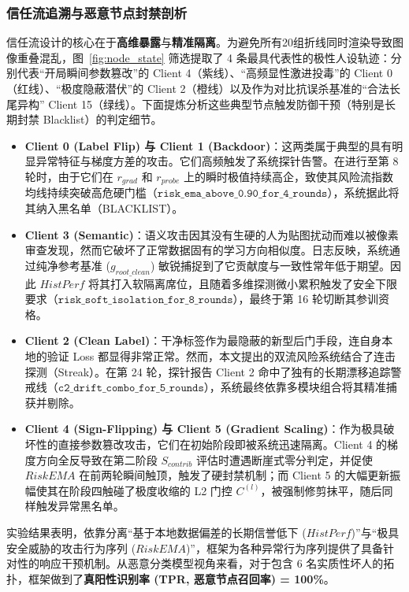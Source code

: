 \documentclass[11pt, a4paper, UTF8, fontset=fandol]{ctexart}
\begin{document}
\subsubsection{信任流追溯与恶意节点封禁剖析}
信任流设计的核心在于\textbf{高维暴露}与\textbf{精准隔离}。为避免所有20组折线同时渲染导致图像重叠混乱，图~\ref{fig:node_state} 筛选提取了 4 条最具代表性的极性人设轨迹：分别代表“开局瞬间参数篡改”的 Client 4（紫线）、“高频显性激进投毒”的 Client 0（红线）、“极度隐蔽潜伏”的 Client 2（橙线）以及作为对比抗误杀基准的“合法长尾异构” Client 15（绿线）。下面提炼分析这些典型节点触发防御干预（特别是长期封禁 Blacklist）的判定细节。
\begin{itemize}
    \item \textbf{Client 0 (Label Flip) 与 Client 1 (Backdoor)}：这两类属于典型的具有明显异常特征与梯度方差的攻击。它们高频触发了系统探针告警。在进行至第 8 轮时，由于它们在 $r_{grad}$ 和 $r_{probe}$ 上的瞬时极值持续高企，致使其风险流指数均线持续突破高危硬门槛（$\texttt{risk\_ema\_above\_0.90\_for\_4\_rounds}$），系统据此将其纳入黑名单（BLACKLIST）。
    \item \textbf{Client 3 (Semantic)}：语义攻击因其没有生硬的人为贴图扰动而难以被像素审查发现，然而它破坏了正常数据固有的学习方向相似度。日志反映，系统通过纯净参考基准 ($g_{root\_clean}$) 敏锐捕捉到了它贡献度与一致性常年低于期望。因此 $HistPerf$ 将其打入软隔离席位，且随着多维探测微小累积触发了安全下限要求（$\texttt{risk\_soft\_isolation\_for\_8\_rounds}$），最终于第 16 轮切断其参训资格。
    \item \textbf{Client 2 (Clean Label)}：干净标签作为最隐蔽的新型后门手段，连自身本地的验证 Loss 都显得非常正常。然而，本文提出的双流风险系统结合了连击探测（Streak）。在第 24 轮，探针报告 Client 2 命中了独有的长期漂移追踪警戒线（$\texttt{c2\_drift\_combo\_for\_5\_rounds}$），系统最终依靠多模块组合将其精准捕获并剔除。
    \item \textbf{Client 4 (Sign-Flipping) 与 Client 5 (Gradient Scaling)}：作为极具破坏性的直接参数篡改攻击，它们在初始阶段即被系统迅速隔离。Client 4 的梯度方向全反导致在第二阶段 $S_{contrib}$ 评估时遭遇断崖式零分判定，并促使 $RiskEMA$ 在前两轮瞬间触顶，触发了硬封禁机制；而 Client 5 的大幅更新振幅使其在阶段四触碰了极度收缩的 L2 门控 $C^{(l)}$，被强制修剪抹平，随后同样触发异常黑名单。
\end{itemize}
实验结果表明，依靠分离“基于本地数据偏差的长期信誉低下 ($HistPerf$)”与“极具安全威胁的攻击行为序列 ($RiskEMA$)”，框架为各种异常行为序列提供了具备针对性的响应干预机制。从恶意分类模型视角来看，对于包含 6 名实质性坏人的拓扑，框架做到了\textbf{真阳性识别率 (TPR, 恶意节点召回率) = 100\%}。
\end{document}
